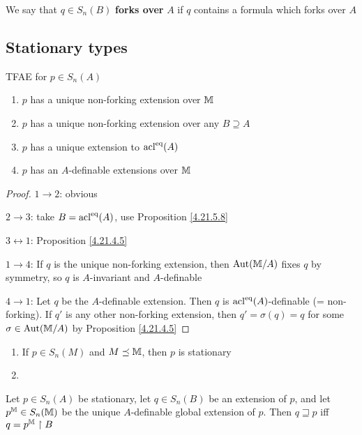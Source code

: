 \documentclass[11pt]{article}
\begin{document}
We say that \(q\in S_n(B)\) \textbf{forks over} \(A\) if \(q\) contains a formula which forks over \(A\)

\subsection{Stationary types}
\label{sec:org0b0688a}
\begin{lemma}[]
TFAE for \(p\in S_n(A)\)
\begin{enumerate}
\item \(p\) has a unique non-forking extension over \(\mathbb{M}\)
\item \(p\) has a unique non-forking extension over any \(B\supseteq A\)
\item \(p\) has a unique extension to \(\operatorname{acl}^{\operatorname{eq}}(A)\)
\item \(p\) has an \(A\)-definable extensions over \(\mathbb{M}\)
\end{enumerate}
\end{lemma}

\begin{proof}
\(1\to 2\): obvious

\(2\to 3\): take \(B=\operatorname{acl}^{\operatorname{eq}}(A)\), use Proposition \ref{4.21.5.8}

\(3\leftrightarrow 1\): Proposition \ref{4.21.4.5}

\(1\to 4\): If \(q\) is the unique non-forking extension, then \(\operatorname{\text{Aut}}(\mathbb{M}/A)\) fixes \(q\) by
symmetry, so \(q\) is \(A\)-invariant and \(A\)-definable

\(4\to 1\): Let \(q\) be the \(A\)-definable extension. Then \(q\) is \(\operatorname{acl}^{\operatorname{eq}}(A)\)-definable
(= non-forking). If \(q'\) is any other non-forking extension, then \(q'=\sigma(q)=q\) for
some \(\sigma\in\operatorname{\text{Aut}}(\mathbb{M}/A)\) by Proposition \ref{4.21.4.5}
\end{proof}

\begin{examplle}[]
\begin{enumerate}
\item If \(p\in S_n(M)\) and \(M\preceq\mathbb{M}\), then \(p\) is stationary
\item 
\end{enumerate}
\end{examplle}

\begin{lemma}[]
Let \(p\in S_n(A)\) be stationary, let \(q\in S_n(B)\) be an extension of \(p\), and
let \(p^{\mathbb{M}}\in S_n(\mathbb{M})\) be the unique \(A\)-definable global extension of \(p\).
Then \(q\sqsupseteq p\) iff \(q=p^{\mathbb{M}}\upharpoonright B\)
\end{lemma}
\end{document}
